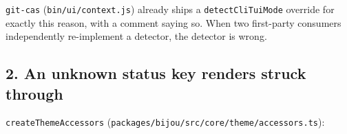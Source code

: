 \texttt{g\allowbreak{}i\allowbreak{}t\allowbreak{}-\allowbreak{}c\allowbreak{}a\allowbreak{}s} (\texttt{b\allowbreak{}i\allowbreak{}n\allowbreak{}/\allowbreak{}u\allowbreak{}i\allowbreak{}/\allowbreak{}c\allowbreak{}o\allowbreak{}n\allowbreak{}t\allowbreak{}e\allowbreak{}x\allowbreak{}t\allowbreak{}.\allowbreak{}j\allowbreak{}s}) already ships a \texttt{d\allowbreak{}e\allowbreak{}t\allowbreak{}e\allowbreak{}c\allowbreak{}t\allowbreak{}C\allowbreak{}l\allowbreak{}i\allowbreak{}T\allowbreak{}u\allowbreak{}i\allowbreak{}M\allowbreak{}o\allowbreak{}d\allowbreak{}e} override for exactly this reason, with a comment saying so. When two first-party consumers independently re-implement a detector, the detector is wrong.

\subsection{2. An unknown status key renders struck through}\label{record-147-an-unknown-status-key-renders-struck-through}

\texttt{c\allowbreak{}r\allowbreak{}e\allowbreak{}a\allowbreak{}t\allowbreak{}e\allowbreak{}T\allowbreak{}h\allowbreak{}e\allowbreak{}m\allowbreak{}e\allowbreak{}A\allowbreak{}c\allowbreak{}c\allowbreak{}e\allowbreak{}s\allowbreak{}s\allowbreak{}o\allowbreak{}r\allowbreak{}s} (\texttt{p\allowbreak{}a\allowbreak{}c\allowbreak{}k\allowbreak{}a\allowbreak{}g\allowbreak{}e\allowbreak{}s\allowbreak{}/\allowbreak{}b\allowbreak{}i\allowbreak{}j\allowbreak{}o\allowbreak{}u\allowbreak{}/\allowbreak{}s\allowbreak{}r\allowbreak{}c\allowbreak{}/\allowbreak{}c\allowbreak{}o\allowbreak{}r\allowbreak{}e\allowbreak{}/\allowbreak{}t\allowbreak{}h\allowbreak{}e\allowbreak{}m\allowbreak{}e\allowbreak{}/\allowbreak{}a\allowbreak{}c\allowbreak{}c\allowbreak{}e\allowbreak{}s\allowbreak{}s\allowbreak{}o\allowbreak{}r\allowbreak{}s\allowbreak{}.\allowbreak{}t\allowbreak{}s}):


